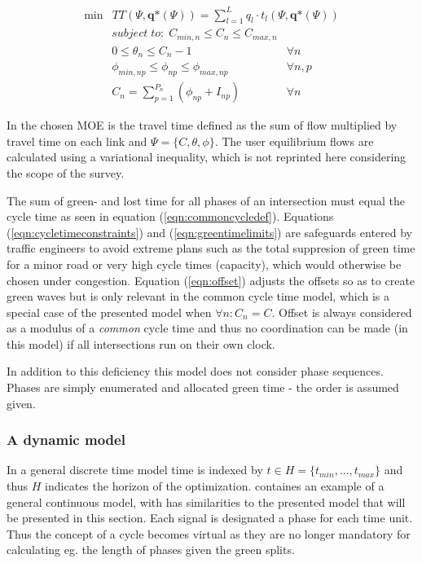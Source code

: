 \begin{eqnarray}
\min & TT(\Psi, \textbf{q*}\left( \Psi\right)) = \displaystyle\sum_{l = 1}^{L} q_l \cdot t_l(\Psi,\textbf{q*}(\Psi))
\end{eqnarray}
\begin{eqnarray}
\label{eqn:cycletimeconstraints} subject\;to:\;C_{min,n} \leq C_n \leq C_{max,n} & \\
\label{eqn:offset} 0 \leq \theta_n \leq C_n-1 & \forall n \\
\label{eqn:greentimelimits} \phi_{min,np} \leq \phi_{np} \leq \phi_{max,np} & \forall n,p \\
\label{eqn:commoncycledef} C_n = \sum_{p=1}^{P_n} ( \phi_{np} + I_{np} ) & \forall n
\end{eqnarray}

In \cite{2} the chosen MOE is the travel time defined as the sum of flow
multiplied by travel time on each link and $\Psi = \lbrace
C,\theta,\phi \rbrace$. The user equilibrium flows are calculated
using a variational inequality, which is not reprinted here
considering the scope of the survey.

The sum of green- and lost time for all phases of an intersection must
equal the cycle time as seen in equation
(\ref{eqn:commoncycledef}). Equations (\ref{eqn:cycletimeconstraints})
and (\ref{eqn:greentimelimits}) are safeguards entered by traffic
engineers to avoid extreme plans such as the total suppresion of green
time for a minor road or very high cycle times (capacity), which would
otherwise be chosen under congestion. Equation (\ref{eqn:offset})
adjusts the offsets so as to create green waves but is only relevant
in the common cycle time model, which is a special case of the
presented model when $\forall n : C_n = C$. Offset is always
considered as a modulus of a \textit{common} cycle time and thus no
coordination can be made (in this model) if all intersections run on
their own clock.

In addition to this deficiency this model does not consider phase
sequences. Phases are simply enumerated and allocated green time - the
order is assumed given.

\subsubsection*{A dynamic model}
\label{sec:dynamicmodel}

In a general discrete time model time is indexed by $t \in H = \lbrace
t_{min},...,t_{max} \rbrace$ and thus $H$ indicates the horizon of the
optimization. \cite{36} containes an example of a general
continuous model, with has similarities to the presented model that
will be presented in this section. Each signal is designated a phase
for each time unit. Thus the concept of a cycle becomes virtual as
they are no longer mandatory for calculating eg. the length of phases
given the green splits.

